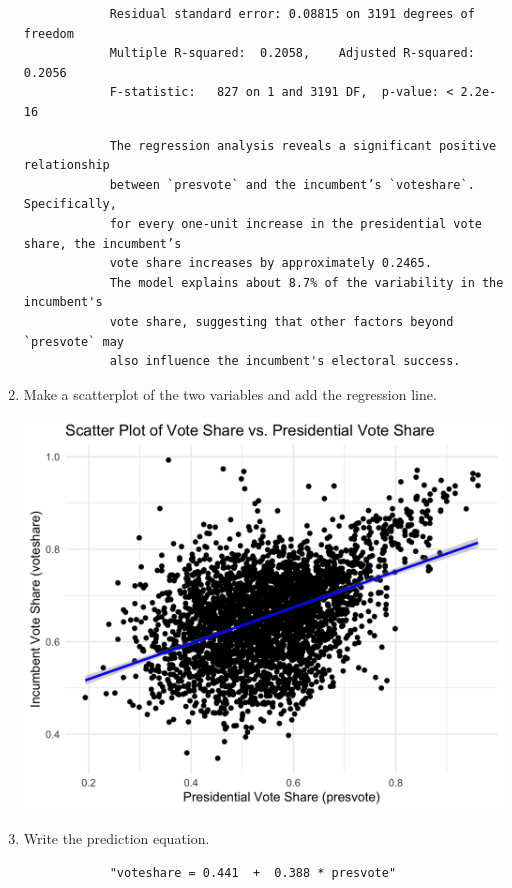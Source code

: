 \documentclass[12pt,letterpaper]{article}
\begin{document}
\begin{enumerate}
\begin{verbatim}
			Residual standard error: 0.08815 on 3191 degrees of freedom
			Multiple R-squared:  0.2058,	Adjusted R-squared:  0.2056 
			F-statistic:   827 on 1 and 3191 DF,  p-value: < 2.2e-16
				\end{verbatim}	
				\begin{verbatim}
			The regression analysis reveals a significant positive relationship 
			between `presvote` and the incumbent’s `voteshare`. Specifically, 
			for every one-unit increase in the presidential vote share, the incumbent’s 
			vote share increases by approximately 0.2465. 
			The model explains about 8.7% of the variability in the incumbent's 
			vote share, suggesting that other factors beyond `presvote` may 
			also influence the incumbent's electoral success.
						\end{verbatim}	
		\item Make a scatterplot of the two variables and add the regression line. 
			 
				\includegraphics[width=.80\textwidth]{Scatterplot_3.2.png}
		\item Write the prediction equation.
		 
		\begin{verbatim}
			"voteshare = 0.441  +  0.388 * presvote"
	\end{verbatim}	
		\end{enumerate}

\newpage	
\end{document}
